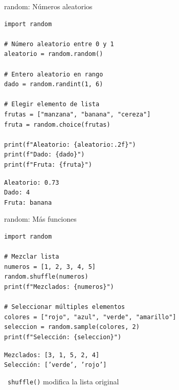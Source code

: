 \documentclass{beamer}
\begin{document}
\begin{frame}[fragile]{random: Números aleatorios \faDice}
\begin{lstlisting}
import random

# Número aleatorio entre 0 y 1
aleatorio = random.random()

# Entero aleatorio en rango
dado = random.randint(1, 6)

# Elegir elemento de lista
frutas = ["manzana", "banana", "cereza"]
fruta = random.choice(frutas)

print(f"Aleatorio: {aleatorio:.2f}")
print(f"Dado: {dado}")
print(f"Fruta: {fruta}")
\end{lstlisting}

\vspace{-0.2cm}
\begin{tcolorbox}[colback=green!10,colframe=green,title={\small\faArrowCircleRight \ Salida (ejemplo)},coltitle=fg0,left=3pt,right=3pt,top=2pt,bottom=2pt,boxsep=1pt]
\small\texttt{Aleatorio: 0.73\\
Dado: 4\\
Fruta: banana}
\end{tcolorbox}
\end{frame}

\begin{frame}[fragile]{random: Más funciones \faShuffle}
\begin{lstlisting}
import random

# Mezclar lista
numeros = [1, 2, 3, 4, 5]
random.shuffle(numeros)
print(f"Mezclados: {numeros}")

# Seleccionar múltiples elementos
colores = ["rojo", "azul", "verde", "amarillo"]
seleccion = random.sample(colores, 2)
print(f"Selección: {seleccion}")
\end{lstlisting}

\vspace{-0.2cm}
\begin{tcolorbox}[colback=green!10,colframe=green,title={\small\faArrowCircleRight \ Salida (ejemplo)},coltitle=fg0,left=3pt,right=3pt,top=2pt,bottom=2pt,boxsep=1pt]
\small\texttt{Mezclados: [3, 1, 5, 2, 4]\\
Selección: ['verde', 'rojo']}
\end{tcolorbox}

\vspace{-0.1cm}
\begin{notebox}
\small\faExclamationTriangle\ \texttt{shuffle()} modifica la lista original
\end{notebox}
\end{frame}
\end{document}
